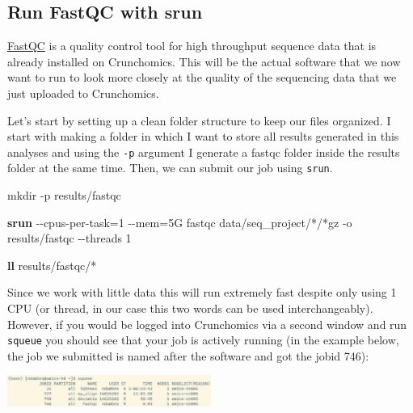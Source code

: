 \documentclass[
  letterpaper,
  DIV=11,
  numbers=noendperiod]{scrreprt}
\newenvironment{Shaded}{}{}
\newcommand{\AttributeTok}[1]{\textcolor[rgb]{0.84,0.23,0.29}{#1}}
\newcommand{\ExtensionTok}[1]{\textcolor[rgb]{0.84,0.23,0.29}{\textbf{#1}}}
\newcommand{\FunctionTok}[1]{\textcolor[rgb]{0.44,0.26,0.76}{#1}}
\newcommand{\NormalTok}[1]{\textcolor[rgb]{0.14,0.16,0.18}{#1}}
\newcommand{\OperatorTok}[1]{\textcolor[rgb]{0.14,0.16,0.18}{#1}}
\newcommand{\PreprocessorTok}[1]{\textcolor[rgb]{0.84,0.23,0.29}{#1}}
\begin{document}
\subsection{Run FastQC with srun}\label{run-fastqc-with-srun}

\href{https://www.bioinformatics.babraham.ac.uk/projects/fastqc/}{FastQC}
is a quality control tool for high throughput sequence data that is
already installed on Crunchomics. This will be the actual software that
we now want to run to look more closely at the quality of the sequencing
data that we just uploaded to Crunchomics.

Let's start by setting up a clean folder structure to keep our files
organized. I start with making a folder in which I want to store all
results generated in this analyses and using the \texttt{-p} argument I
generate a fastqc folder inside the results folder at the same time.
Then, we can submit our job using \texttt{srun}.

\begin{Shaded}
\begin{Highlighting}[]
\FunctionTok{mkdir} \AttributeTok{{-}p}\NormalTok{ results/fastqc }

\ExtensionTok{srun} \AttributeTok{{-}{-}cpus{-}per{-}task}\OperatorTok{=}\NormalTok{1 }\AttributeTok{{-}{-}mem}\OperatorTok{=}\NormalTok{5G fastqc data/seq\_project/}\PreprocessorTok{*}\NormalTok{/}\PreprocessorTok{*}\NormalTok{gz }\AttributeTok{{-}o}\NormalTok{ results/fastqc  }\AttributeTok{{-}{-}threads}\NormalTok{ 1}

\ExtensionTok{ll}\NormalTok{ results/fastqc/}\PreprocessorTok{*}
\end{Highlighting}
\end{Shaded}

Since we work with little data this will run extremely fast despite only
using 1 CPU (or thread, in our case this two words can be used
interchangeably). However, if you would be logged into Crunchomics via a
second window and run \texttt{squeue} you should see that your job is
actively running (in the example below, the job we submitted is named
after the software and got the jobid 746):

\begin{center}
\includegraphics[width=0.5\textwidth,height=\textheight]{../img/squeue2.png}
\end{center}
\end{document}
